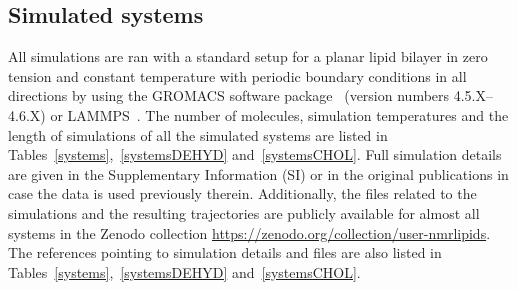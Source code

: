 \documentclass[journal=jacsat,manuscript=article]{achemso}
\begin{document}
\subsection{Simulated systems}
All simulations are ran with a standard setup for a planar lipid bilayer in zero tension and constant temperature
with periodic boundary conditions in all directions by using the GROMACS software package~\cite{hess08} 
(version numbers 4.5.X--4.6.X) or LAMMPS~\cite{plimpton95}.
The number of molecules, simulation temperatures and the length of simulations of all the simulated systems 
are listed in Tables~\ref{systems},~\ref{systemsDEHYD} and~\ref{systemsCHOL}. Full simulation
details are given in the Supplementary Information (SI) or in the original publications in case the
data is used previously therein. Additionally, the files related to the simulations and the resulting trajectories are publicly
available for almost all systems in the Zenodo collection \url{https://zenodo.org/collection/user-nmrlipids}. 
The references pointing to simulation details and files are also listed in Tables~\ref{systems},~\ref{systemsDEHYD} and~\ref{systemsCHOL}.
\end{document}
